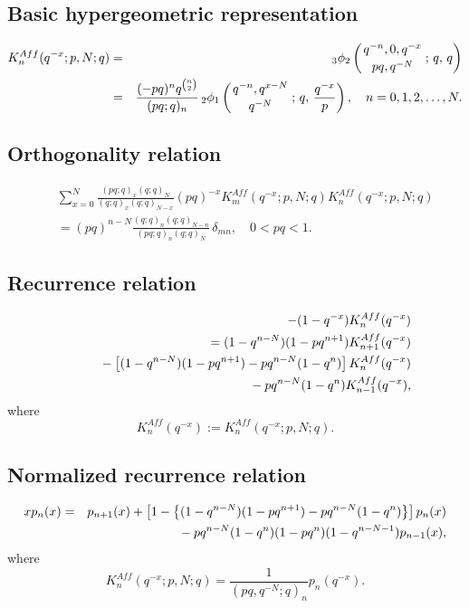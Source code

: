 \documentclass[envcountchap,graybox]{svmono}
\newcommand{\qhyp}[5]{\mbox{}_{#1}{\phi}_{#2}
\left(\genfrac{}{}{0pt}{}{#3}{#4}\,;\,q,\,#5\right)}
\newcommand{\mathindent}{\hspace{7.5mm}}
\begin{document}
\subsection*{Basic hypergeometric representation}
\begin{eqnarray}
\label{DefAffqKrawtchouk}
K_n^{Aff}(q^{-x};p,N;q)&=&\qhyp{3}{2}{q^{-n},0,q^{-x}}{pq,q^{-N}}{q}\\
&=&\frac{(-pq)^nq^{\binom{n}{2}}}{(pq;q)_n}\,
\qhyp{2}{1}{q^{-n},q^{x-N}}{q^{-N}}{\frac{q^{-x}}{p}},\quad n=0,1,2,\ldots,N.\nonumber
\end{eqnarray}

\subsection*{Orthogonality relation}
\begin{eqnarray}
\label{OrtAffqKrawtchouk}
& &\sum_{x=0}^N\frac{(pq;q)_x(q;q)_N}{(q;q)_x(q;q)_{N-x}}(pq)^{-x}K_m^{Aff}(q^{-x};p,N;q)K_n^{Aff}(q^{-x};p,N;q)\nonumber\\
& &{}=(pq)^{n-N}\frac{(q;q)_n(q;q)_{N-n}}{(pq;q)_n(q;q)_N}\,\delta_{mn},\quad 0<pq<1.
\end{eqnarray}

\subsection*{Recurrence relation}
\begin{eqnarray}
\label{RecAffqKrawtchouk}
& &-(1-q^{-x})K_n^{Aff}(q^{-x})\nonumber\\
& &{}=(1-q^{n-N})(1-pq^{n+1})K_{n+1}^{Aff}(q^{-x})\nonumber\\
& &{}\mathindent{}-\left[(1-q^{n-N})(1-pq^{n+1})-pq^{n-N}(1-q^n)\right]K_n^{Aff}(q^{-x})\nonumber\\
& &{}\mathindent\mathindent{}-pq^{n-N}(1-q^n)K_{n-1}^{Aff}(q^{-x}),
\end{eqnarray}
where
$$K_n^{Aff}(q^{-x}):=K_n^{Aff}(q^{-x};p,N;q).$$

\subsection*{Normalized recurrence relation}
\begin{eqnarray}
\label{NormRecAffqKrawtchouk}
xp_n(x)&=&p_{n+1}(x)+
\left[1-\left\{(1-q^{n-N})(1-pq^{n+1})-pq^{n-N}(1-q^n)\right\}\right]p_n(x)\nonumber\\
& &{}\mathindent{}-pq^{n-N}(1-q^n)(1-pq^n)(1-q^{n-N-1})p_{n-1}(x),
\end{eqnarray}
where
$$K_n^{Aff}(q^{-x};p,N;q)=\frac{1}{(pq,q^{-N};q)_n}p_n(q^{-x}).$$
\end{document}

